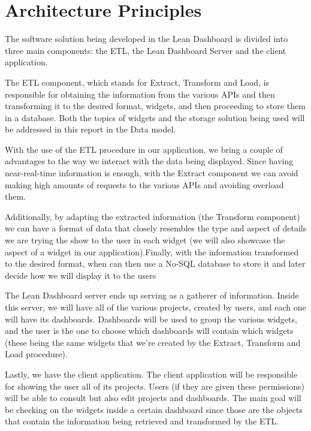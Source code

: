 \documentclass[a4paper,twoside,10pt]{report}
\begin{document}
\section{Architecture Principles}
The software solution being developed in the Lean Dashboard is divided into three main components: the ETL\cite{ETLPROC}, the Lean Dashboard Server and the client application.
 
The ETL component, which stands for Extract, Transform and Load,  is responsible for obtaining the information from the various APIs and then transforming it to the desired format, widgets, and then proceeding to store them in a database. Both the topics of widgets and the storage solution being used will be addressed in this report in the Data model.
 
With the use of the ETL procedure in our application, we bring a couple of advantages to the way we interact with the data being displayed. Since having near-real-time information is enough, with the Extract component we can avoid making high amounts of requests to the various APIs and avoiding overload them.
 
Additionally, by adapting the extracted information (the Transform component) we can have a format of data that closely resembles the type and aspect of details we are trying the show to the user in each widget (we will also showcase the aspect of a widget in our application).Finally, with the information transformed to the desired format, when can then use a No-SQL database to store it and later decide how we will display it to the users 
 
The Lean Dashboard server ends up serving as a gatherer of information. Inside this server, we will have all of the various projects, created by users, and each one will have its dashboards. Dashboards will be used to group the various widgets, and the user is the one to choose which dashboards will contain which widgets (these being the same widgets that we're created by the Extract, Transform and Load procedure).
 
Lastly, we have the client application. The client application will be responsible for showing the user all of its projects. Users (if they are given these permissions) will be able to consult but also edit projects and dashboards. The main goal will be checking on the widgets inside a certain dashboard since those are the objects that contain the information being retrieved and transformed by the ETL.
\end{document}
